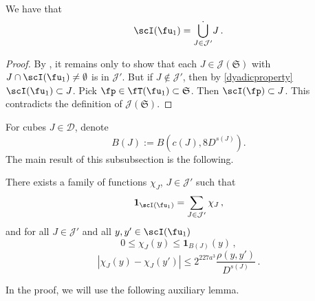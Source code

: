     \begin{lemma}
        \label{dyadic-partition-1}
        \leanok
        We have that
        $$
            \scI(\fu_1) = \dot{\bigcup_{J \in \mathcal{J}'}} J\,.
        $$
    \end{lemma}

    \begin{proof}
        \leanok
        By , it remains only to show that each $J \in \mathcal{J}(\mathfrak{S})$ with $J \cap \scI(\fu_1) \ne \emptyset$ is in $\mathcal{J}'$. But if $J \notin \mathcal{J}'$, then by \eqref{dyadicproperty} $\scI(\fu_1) \subset J$. Pick $\fp \in \fT(\fu_1) \subset \mathfrak{S}$. Then $\scI(\fp) \subset J$. This contradicts the definition of $\mathcal{J}(\mathfrak{S})$.
    \end{proof}

    For cubes $J \in \mathcal{D}$, denote
    \begin{equation}
        \label{def-BJ}
        B(J) := B(c(J), 8D^{s(J)}).
    \end{equation}
    The main result of this subsubsection is the following.

    \begin{lemma}
        \label{Lipschitz-partition-unity}
        \leanok
        There exists a family of functions $\chi_J$, $J \in \mathcal{J}'$ such that \begin{equation}
            \label{eq-pao-1}
            \mathbf{1}_{\scI(\fu_1)} = \sum_{J \in \mathcal{J}'} \chi_J\,,
        \end{equation}
        and for all $J \in \mathcal{J}'$ and all $y,y' \in \scI(\fu_1)$
      \begin{equation}
            \label{eq-pao-2}
            0 \leq \chi_J(y) \leq \mathbf{1}_{B(J)}(y)\,,
        \end{equation}
      \begin{equation}
            \label{eq-pao-3}
            |\chi_J(y) - \chi_J(y')| \le 2^{227a^3} \frac{\rho(y,y')}{D^{s(J)}}\,.
        \end{equation}
    \end{lemma}

    In the proof, we will use the following auxiliary lemma.


